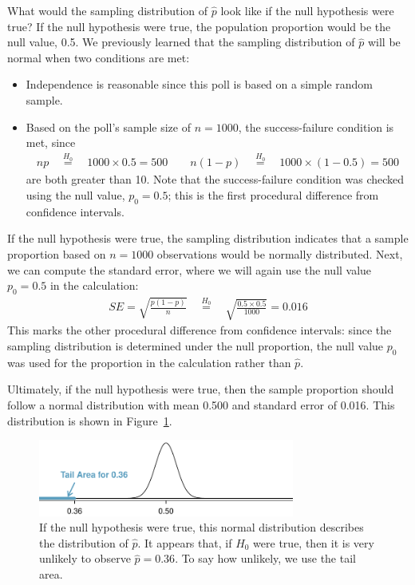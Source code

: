 \begin{example}{What would the sampling distribution of $\hat{p}$
    look like if the null hypothesis were true?}
  If the null hypothesis were true, the population proportion
  would be the null value, 0.5. We previously learned that
  the sampling distribution of $\hat{p}$ will be normal when
  two conditions are met:
  \begin{itemize}
    \item Independence is reasonable since this poll is based on
        a simple random sample.
    \item Based on the poll's sample size of $n = 1000$,
        the success-failure condition is met, since
        \begin{align*}
        np \quad \stackrel{H_0}{=} \quad 1000 \times 0.5 = 500
        \qquad
        n (1 - p) \quad \stackrel{H_0}{=} \quad 1000 \times (1 - 0.5) = 500
        \end{align*}
        are both greater than 10. Note that the success-failure
        condition was checked using the null value, $p_0 = 0.5$;
        this is the first procedural difference from confidence
        intervals.
  \end{itemize}
  If the null hypothesis were true, the sampling distribution
  indicates that a sample proportion based on $n = 1000$ observations
  would be normally distributed. Next, we can compute the standard
  error, where we will again use the null value $p_0 = 0.5$ in the
  calculation:
  \begin{align*}
  SE = \sqrt{\frac{p (1 - p)}{n}}
      \quad \stackrel{H_0}{=} \quad \sqrt{\frac{0.5 \times 0.5}{1000}}
      = 0.016
  \end{align*}
  This marks the other procedural difference from confidence
  intervals: since the sampling distribution is determined
  under the null proportion, the null value $p_0$ was used for
  the proportion in the calculation rather than $\hat{p}$.

  Ultimately, if the null hypothesis were true, then the sample
  proportion should follow a normal distribution with mean 0.500
  and standard error of 0.016. This distribution is shown in
  Figure~\ref{normal_dist_mean_500_se_016}.
\end{example}

\begin{figure}[hht]
\centering
\includegraphics[width=0.75\textwidth]{ch_inference_for_props/figures/normal_dist_mean_500_se_016/normal_dist_mean_500_se_016}
\caption{
  If the null hypothesis were true, this normal distribution
  describes the distribution of $\hat{p}$. It appears that,
  if $H_0$ were true, then it is very unlikely to observe
  $\hat{p} = 0.36$. To say how unlikely, we use the tail area.}
\label{normal_dist_mean_500_se_016}
\end{figure}


